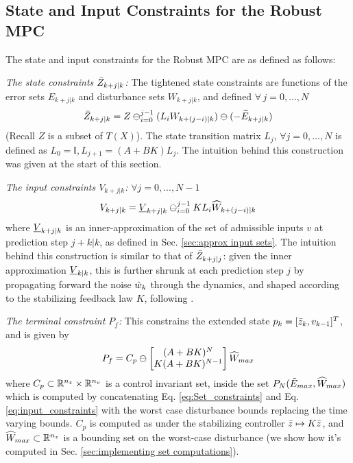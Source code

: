 \subsection{State and Input Constraints for the Robust MPC}
\label{sec:Constraints}
The state and input constraints for the Robust MPC are as defined as follows:

\textit{The state constraints $\bar{Z}_{k+j|k}$:}
The tightened state constraints are functions of the error sets $E_{k+j|k}$ and disturbance sets $W_{k+j|k}$, and defined $\forall\,j=0,\dotsc,N$
{\small{
\begin{equation} 
\label{eq:Set_constraints}
\bar{Z}_{k+j|k} = Z \ominus_{i=0}^{j-1}(L_iW_{k+(j-i)|k})\ominus (-\widetilde{E}_{k+j|k})
\end{equation}
}}
(Recall $Z$ is a subset of $T(X)$).
The state transition matrix $L_j$, $\forall j=0,\dotsc,N$   is defined as $L_0 = \mathbb{I}, L_{j+1} = (A+BK)L_j $.
The intuition behind this construction was given at the start of this section.

\textit{The input constraints $V_{k+j|k}$:}
$\forall j=0,...,N-1$
\begin{equation} 
\label{eq:input_constraints}
V_{k+j|k} = \underline{V}_{k+j|k} \ominus_{i=0}^{j-1}KL_i\widehat{W}_{k+(j-i)|k} 
\end{equation}
where $\underline{V}_{k+j|k} $ is an inner-approximation of the set of admissible inputs $v$ at prediction step $j+k|k$, as defined in Sec. \ref{sec:approx input sets}.
The intuition behind this construction is similar to that of $\bar{Z}_{k+j|j}$: given the inner approximation $\underline{V}_{k|k} $, this is further shrunk at each prediction step $j$ by propagating forward the noise $\hat{w}_k$ through the dynamics, and shaped according to the stabilizing feedback law $K$, following \cite{RichardsH05_RMPC}.

\textit{The terminal constraint $P_f$:}
This constrains the extended state $p_k = [\bar{z}_{k}, v_{k-1}]^T$, and is given by 
\begin{equation}
\label{eq:P_f_def}
P_f = C_p\ominus \left\lbrack \begin{matrix} (A+BK)^N \\ K(A+BK)^{N-1}\end{matrix} \right \rbrack \widehat{W}_{max}
\end{equation}
where $C_p \subset \mathbb{R}^{n_z}\times \mathbb{R}^{n_v}$ is a control invariant set, inside the set $P_N(\tilde{E}_{max},\widehat{W}_{max})$ which is computed by concatenating Eq. \ref{eq:Set_constraints} and Eq. \ref{eq:input_constraints} with the worst case disturbance bounds replacing the time varying bounds. $C_p$ is computed as  under the stabilizing controller $\bar{z} \mapsto K\bar{z}$, 
and $\widehat{W}_{max} \subset \mathbb{R}^{n_z}$ is a bounding set on the worst-case disturbance (we show how it's computed in Sec. \ref{sec:implementing set computations}).

